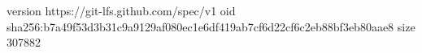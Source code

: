version https://git-lfs.github.com/spec/v1
oid sha256:b7a49f53d3b31c9a9129af080ec1e6df419ab7cf6d22cf6c2eb88bf3eb80aae8
size 307882
